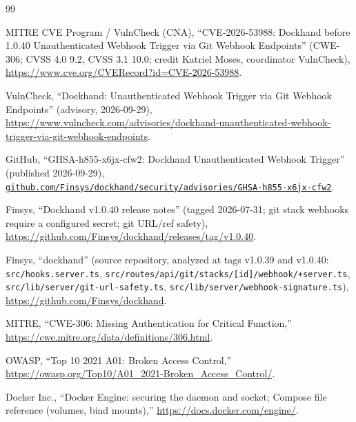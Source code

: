 \documentclass[journal]{IEEEtran}
\begin{document}
\begin{thebibliography}{99}

MITRE CVE Program / VulnCheck (CNA), ``CVE-2026-53988: Dockhand before 1.0.40
Unauthenticated Webhook Trigger via Git Webhook Endpoints'' (CWE-306; CVSS 4.0
9.2, CVSS 3.1 10.0; credit Katriel Moses, coordinator VulnCheck),
\url{https://www.cve.org/CVERecord?id=CVE-2026-53988}.

VulnCheck, ``Dockhand: Unauthenticated Webhook Trigger via Git Webhook
Endpoints'' (advisory, 2026-09-29),
\url{https://www.vulncheck.com/advisories/dockhand-unauthenticated-webhook-trigger-via-git-webhook-endpoints}.

GitHub, ``GHSA-h855-x6jx-cfw2: Dockhand Unauthenticated Webhook Trigger''
(published 2026-09-29),
\href{https://github.com/Finsys/dockhand/security/advisories/GHSA-h855-x6jx-cfw2}{\texttt{github.com/Finsys/}\hspace{0pt}\texttt{dockhand/security/}\hspace{0pt}\texttt{advisories/GHSA-}\hspace{0pt}\texttt{h855-x6jx-cfw2}}.

Finsys, ``Dockhand v1.0.40 release notes'' (tagged 2026-07-31; git stack
webhooks require a configured secret; git URL/ref safety),
\url{https://github.com/Finsys/dockhand/releases/tag/v1.0.40}.

Finsys, ``dockhand'' (source repository, analyzed at tags v1.0.39 and
v1.0.40: \texttt{src/hooks.}\allowbreak\texttt{server.ts},
\texttt{src/routes/api/}\allowbreak\texttt{git/stacks/[id]/}\allowbreak\texttt{webhook/}\allowbreak\texttt{+server.ts},
\texttt{src/lib/server/}\allowbreak\texttt{git-url-}\allowbreak\texttt{safety.ts},
\texttt{src/lib/server/}\allowbreak\texttt{webhook-signature.ts}),
\url{https://github.com/Finsys/dockhand}.

MITRE, ``CWE-306: Missing Authentication for Critical Function,''
\url{https://cwe.mitre.org/data/definitions/306.html}.

OWASP, ``Top 10 2021 A01: Broken Access Control,''
\url{https://owasp.org/Top10/A01_2021-Broken_Access_Control/}.

Docker Inc., ``Docker Engine: securing the daemon and socket; Compose file
reference (volumes, bind mounts),''
\url{https://docs.docker.com/engine/}.


\end{thebibliography}
\end{document}
